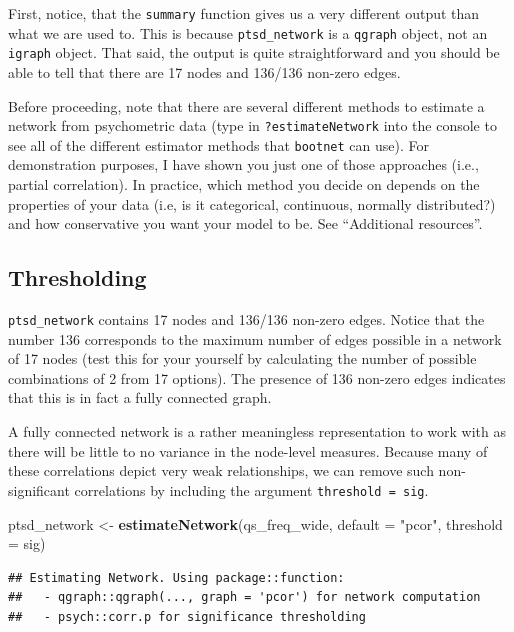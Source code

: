 \documentclass[
]{book}
\newenvironment{Shaded}{\begin{snugshade}}{\end{snugshade}}
\newcommand{\AttributeTok}[1]{\textcolor[rgb]{0.13,0.29,0.53}{#1}}
\newcommand{\FunctionTok}[1]{\textcolor[rgb]{0.13,0.29,0.53}{\textbf{#1}}}
\newcommand{\NormalTok}[1]{#1}
\newcommand{\OtherTok}[1]{\textcolor[rgb]{0.56,0.35,0.01}{#1}}
\newcommand{\StringTok}[1]{\textcolor[rgb]{0.31,0.60,0.02}{#1}}
\begin{document}
First, notice, that the \texttt{summary} function gives us a very different output than what we are used to. This is because \texttt{ptsd\_network} is a \texttt{qgraph} object, not an \texttt{igraph} object. That said, the output is quite straightforward and you should be able to tell that there are 17 nodes and 136/136 non-zero edges.

Before proceeding, note that there are several different methods to estimate a network from psychometric data (type in \texttt{?estimateNetwork} into the console to see all of the different estimator methods that \texttt{bootnet} can use). For demonstration purposes, I have shown you just one of those approaches (i.e., partial correlation). In practice, which method you decide on depends on the properties of your data (i.e, is it categorical, continuous, normally distributed?) and how conservative you want your model to be. See ``Additional resources''.

\subsection{Thresholding}\label{thresholding}

\texttt{ptsd\_network} contains 17 nodes and 136/136 non-zero edges. Notice that the number 136 corresponds to the maximum number of edges possible in a network of 17 nodes (test this for your yourself by calculating the number of possible combinations of 2 from 17 options). The presence of 136 non-zero edges indicates that this is in fact a fully connected graph.

A fully connected network is a rather meaningless representation to work with as there will be little to no variance in the node-level measures. Because many of these correlations depict very weak relationships, we can remove such non-significant correlations by including the argument \texttt{threshold\ =\ \textquotesingle{}sig\textquotesingle{}}.

\begin{Shaded}
\begin{Highlighting}[]
\NormalTok{ptsd\_network }\OtherTok{\textless{}{-}} \FunctionTok{estimateNetwork}\NormalTok{(qs\_freq\_wide, }\AttributeTok{default =} \StringTok{"pcor"}\NormalTok{, }
                                \AttributeTok{threshold =} \StringTok{\textquotesingle{}sig\textquotesingle{}}\NormalTok{) }
\end{Highlighting}
\end{Shaded}

\begin{verbatim}
## Estimating Network. Using package::function:
##   - qgraph::qgraph(..., graph = 'pcor') for network computation
##   - psych::corr.p for significance thresholding
\end{verbatim}
\end{document}
